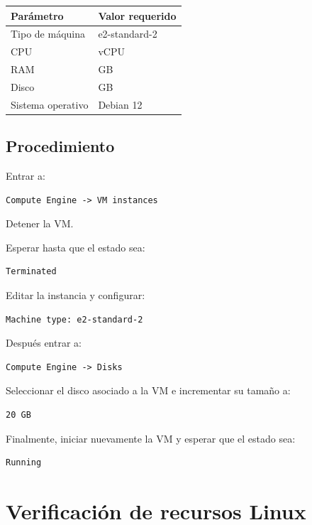 \documentclass[
  coursetitle={Cómputo Nube y Tecnologías Emergentes},
  coursehours={96},
  coursedate={Verano 2026},
  doctype={Práctica},
  otherlangs={english,french},
  authorname={Lázaro},
  authorsurname={Bustio-Martínez},
  authortitle={PhD},
  role={Profesor Investigador},
  email={lbustio@inaoe.mx},
  phone={5559504000},
  ext={7459},
  institution={Instituto Nacional de Astrofísica, Óptica y Electrónica (INAOE)},
  department={Maestría en Ciencias en Tecnologías de Seguridad},
  address={Luis Enrique Erro 1, Sta. Ma. Tonantzintla, San Andrés Cholula, CP 72840, Puebla, México},
  margin={0.5in}
]{../../lbustio_lecture_notes}
\begin{document}
\begin{center}
\begin{tabularx}{0.8\textwidth}{|>{\raggedright\arraybackslash}X|>{\raggedright\arraybackslash}X|}
\hline
\textbf{Parámetro} & \textbf{Valor requerido} \\
\hline
Tipo de máquina & e2-standard-2 \\
\hline
CPU & 2 vCPU \\
\hline
RAM & 8 GB \\
\hline
Disco & 20 GB \\
\hline
Sistema operativo & Debian 12 \\
\hline
\end{tabularx}
\end{center}

\subsection{Procedimiento}

Entrar a:

\begin{verbatim}
Compute Engine -> VM instances
\end{verbatim}

Detener la VM.

Esperar hasta que el estado sea:

\begin{verbatim}
Terminated
\end{verbatim}

Editar la instancia y configurar:

\begin{verbatim}
Machine type: e2-standard-2
\end{verbatim}

Después entrar a:

\begin{verbatim}
Compute Engine -> Disks
\end{verbatim}

Seleccionar el disco asociado a la VM e incrementar su tamaño a:

\begin{verbatim}
20 GB
\end{verbatim}

Finalmente, iniciar nuevamente la VM y esperar que el estado sea:

\begin{verbatim}
Running
\end{verbatim}

\section{Verificación de recursos Linux}
\end{document}
